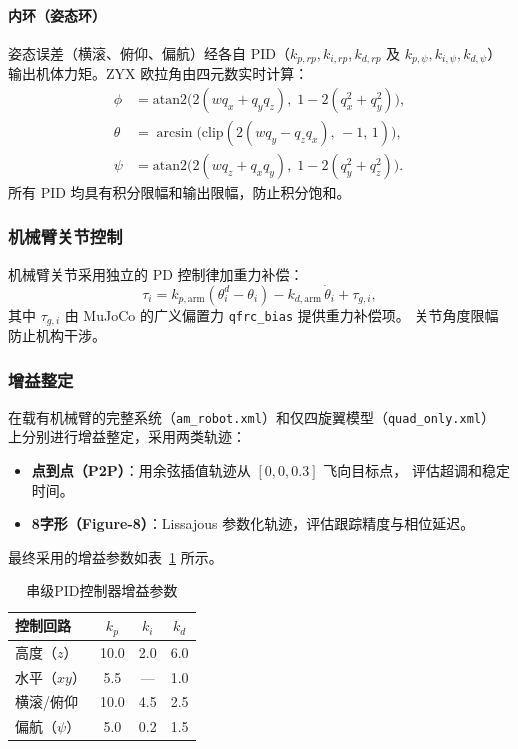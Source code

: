 \paragraph{内环（姿态环）}
姿态误差（横滚、俯仰、偏航）经各自 PID（$k_{p,rp},k_{i,rp},k_{d,rp}$ 及
$k_{p,\psi},k_{i,\psi},k_{d,\psi}$）输出机体力矩。ZYX 欧拉角由四元数实时计算：
\begin{align}
    \phi   &= \mathrm{atan2}\!\bigl(2(wq_x+q_yq_z),\;1-2(q_x^2+q_y^2)\bigr), \\
    \theta &= \arcsin\!\bigl(\mathrm{clip}(2(wq_y-q_zq_x),\,-1,\,1)\bigr), \\
    \psi   &= \mathrm{atan2}\!\bigl(2(wq_z+q_xq_y),\;1-2(q_y^2+q_z^2)\bigr).
\end{align}
所有 PID 均具有积分限幅和输出限幅，防止积分饱和。

\subsubsection{机械臂关节控制}

机械臂关节采用独立的 PD 控制律加重力补偿：
\begin{equation}
    \tau_i = k_{p,\mathrm{arm}}\!\left(\theta_i^d - \theta_i\right)
           - k_{d,\mathrm{arm}}\,\dot{\theta}_i
           + \tau_{g,i},
\end{equation}
其中 $\tau_{g,i}$ 由 MuJoCo 的广义偏置力 \texttt{qfrc\_bias} 提供重力补偿项。
关节角度限幅防止机构干涉。

\subsubsection{增益整定}

在载有机械臂的完整系统（\texttt{am\_robot.xml}）和仅四旋翼模型（\texttt{quad\_only.xml}）
上分别进行增益整定，采用两类轨迹：

\begin{itemize}
    \item \textbf{点到点（P2P）}：用余弦插值轨迹从 $[0,0,0.3]$ 飞向目标点，
          评估超调和稳定时间。
    \item \textbf{8字形（Figure-8）}：Lissajous 参数化轨迹，评估跟踪精度与相位延迟。
\end{itemize}

最终采用的增益参数如表~\ref{tab:pid_gains} 所示。

\begin{table}[h]
\centering
\caption{串级PID控制器增益参数}
\label{tab:pid_gains}
\begin{tabular}{lccc}
\hline
\textbf{控制回路} & \textbf{$k_p$} & \textbf{$k_i$} & \textbf{$k_d$} \\
\hline
高度（$z$）     & 10.0 & 2.0 & 6.0 \\
水平（$xy$）    & 5.5  & —   & 1.0 \\
横滚/俯仰       & 10.0 & 4.5 & 2.5 \\
偏航（$\psi$）  & 5.0  & 0.2 & 1.5 \\
\hline
\end{tabular}
\end{table}

